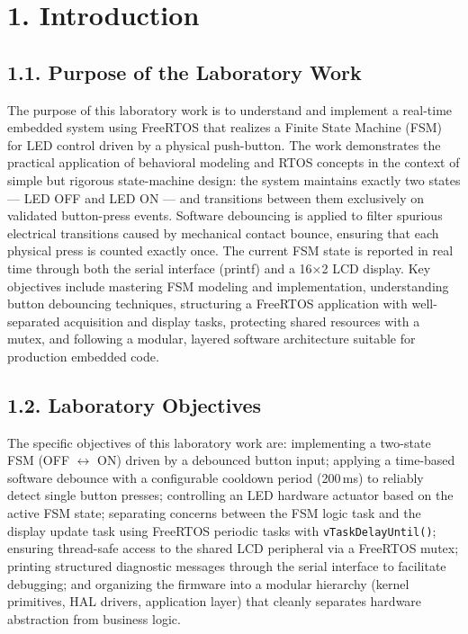 \documentclass[12pt]{article}
\begin{document}
\setcounter{page}{1}
\pagestyle{fancy}
\fancyhf{}
\rhead{\thepage}

\section*{1. Introduction}

\subsection*{1.1. Purpose of the Laboratory Work}

The purpose of this laboratory work is to understand and implement a real-time embedded system using FreeRTOS that realizes a Finite State Machine (FSM) for LED control driven by a physical push-button. The work demonstrates the practical application of behavioral modeling and RTOS concepts in the context of simple but rigorous state-machine design: the system maintains exactly two states — LED OFF and LED ON — and transitions between them exclusively on validated button-press events. Software debouncing is applied to filter spurious electrical transitions caused by mechanical contact bounce, ensuring that each physical press is counted exactly once. The current FSM state is reported in real time through both the serial interface (printf) and a 16×2 LCD display. Key objectives include mastering FSM modeling and implementation, understanding button debouncing techniques, structuring a FreeRTOS application with well-separated acquisition and display tasks, protecting shared resources with a mutex, and following a modular, layered software architecture suitable for production embedded code.

\subsection*{1.2. Laboratory Objectives}

The specific objectives of this laboratory work are: implementing a two-state FSM (OFF $\leftrightarrow$ ON) driven by a debounced button input; applying a time-based software debounce with a configurable cooldown period (200\,ms) to reliably detect single button presses; controlling an LED hardware actuator based on the active FSM state; separating concerns between the FSM logic task and the display update task using FreeRTOS periodic tasks with \texttt{vTaskDelayUntil()}; ensuring thread-safe access to the shared LCD peripheral via a FreeRTOS mutex; printing structured diagnostic messages through the serial interface to facilitate debugging; and organizing the firmware into a modular hierarchy (kernel primitives, HAL drivers, application layer) that cleanly separates hardware abstraction from business logic.
\end{document}
